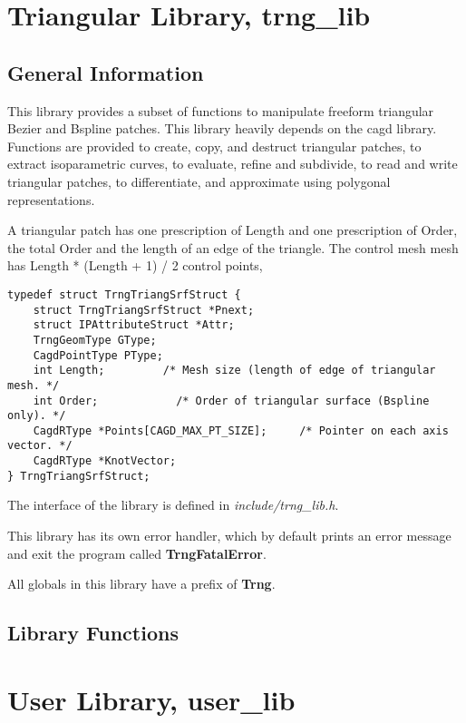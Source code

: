 {\chapter{Triangular Library, trng\_lib}

\section{General Information}

This library provides a subset of functions to manipulate freeform
triangular Bezier and Bspline patches. This library heavily depends on
the cagd library. Functions are provided to create, copy, and destruct
triangular patches, to extract isoparametric curves, to evaluate,
refine and subdivide, to read and write triangular patches, to
differentiate, and approximate using polygonal representations.

A triangular patch has one prescription of Length and one prescription
of Order, the total Order and the length of an edge of the triangle.
The control mesh mesh has Length * (Length + 1) / 2 control points,
\begin{verbatim}
typedef struct TrngTriangSrfStruct {
    struct TrngTriangSrfStruct *Pnext;
    struct IPAttributeStruct *Attr;
    TrngGeomType GType;
    CagdPointType PType;
    int Length;		    /* Mesh size (length of edge of triangular mesh. */
    int Order;		      /* Order of triangular surface (Bspline only). */
    CagdRType *Points[CAGD_MAX_PT_SIZE];     /* Pointer on each axis vector. */
    CagdRType *KnotVector;
} TrngTriangSrfStruct;
\end{verbatim}

The interface of the library is defined in {\em include/trng\_lib.h}. 

This library has its own error handler, which by default prints an
error message and exit the program called {\bf TrngFatalError}.

All globals in this library have a prefix of {\bf Trng}.

\section{Library Functions}


\chapter{User Library, user\_lib}

}
